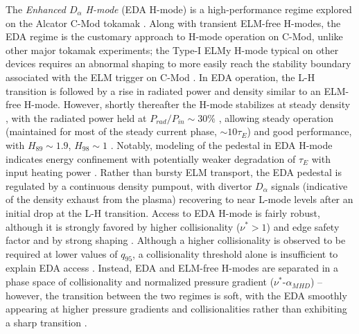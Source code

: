 The \emph{Enhanced $D_\alpha$ H-mode} (EDA H-mode) is a high-performance regime explored on the Alcator C-Mod tokamak \cite{Greenwald1999,Hubbard2001,Hughes2005}.  Along with transient ELM-free H-modes, the EDA regime is the customary approach to H-mode operation on C-Mod, unlike other major tokamak experiments; the Type-I ELMy H-mode typical on other devices requires an abnormal shaping to more easily reach the stability boundary associated with the ELM trigger on C-Mod \cite{Hughes2013}.  In EDA operation, the L-H transition is followed by a rise in radiated power and density similar to an ELM-free H-mode.  However, shortly thereafter the H-mode stabilizes at steady density \cite{Greenwald1999}, with the radiated power held at $P_{rad}/P_{in} \sim 30\%$ \cite{Hubbard1998}, allowing steady operation (maintained for most of the steady current phase, $\sim 10\tau_E$) 
and good performance, with $H_{89} \sim 1.9$, $H_{98} \sim 1$ \cite{Hubbard2001}.  Notably, modeling of the pedestal in EDA H-mode indicates energy confinement with potentially weaker degradation of $\tau_E$ with input heating power \cite{Hughes2002,Hughes2005,Hughes2006}.  Rather than bursty ELM transport, the EDA pedestal is regulated by a continuous density pumpout, with divertor $D_\alpha$ signals (indicative of the density exhaust from the plasma) recovering to near L-mode levels after an initial drop at the L-H transition.  Access to EDA H-mode is fairly robust, although it is strongly favored by higher collisionality ($\nu^* > 1$) and edge safety factor \cite{Hughes2002,Mossessian2002} and by strong shaping \cite{Mossessian2002}.  Although a higher collisionality is observed to be required at lower values of $q_{95}$, a collisionality threshold alone is insufficient to explain EDA access \cite{Hughes2002}.  
Instead, EDA and ELM-free H-modes are separated in a phase space of collisionality and normalized pressure gradient ($\nu^*$-$\alpha_{MHD}$) -- however, the transition between the two regimes is soft, with the EDA smoothly appearing at higher pressure gradients and collisionalities rather than exhibiting a sharp transition \cite{Hughes2007a}.

